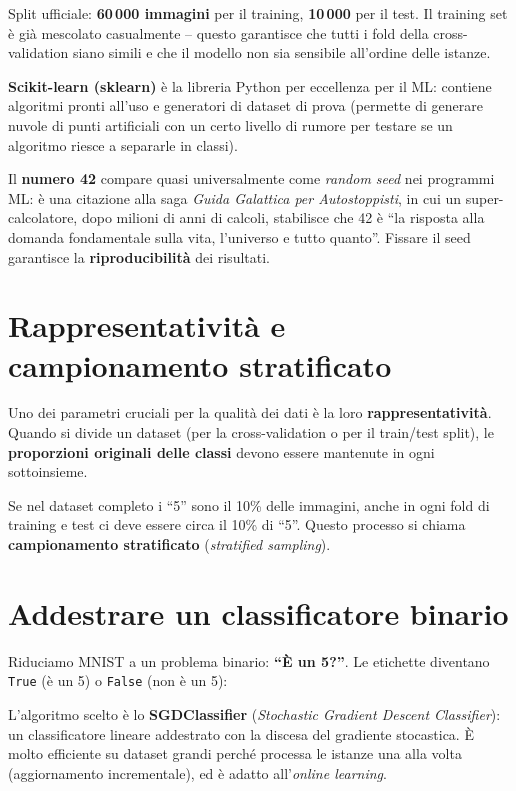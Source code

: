 Split ufficiale: \textbf{60\,000 immagini} per il training, \textbf{10\,000} per il test. Il training set è già mescolato casualmente -- questo garantisce che tutti i fold della cross-validation siano simili e che il modello non sia sensibile all'ordine delle istanze.

\begin{notebox}
\textbf{Scikit-learn (sklearn)} è la libreria Python per eccellenza per il ML: contiene algoritmi pronti all'uso e generatori di dataset di prova (permette di generare nuvole di punti artificiali con un certo livello di rumore per testare se un algoritmo riesce a separarle in classi).

Il \textbf{numero 42} compare quasi universalmente come \emph{random seed} nei programmi ML: è una citazione alla saga \emph{Guida Galattica per Autostoppisti}, in cui un super-calcolatore, dopo milioni di anni di calcoli, stabilisce che 42 è ``la risposta alla domanda fondamentale sulla vita, l'universo e tutto quanto''. Fissare il seed garantisce la \textbf{riproducibilità} dei risultati.
\end{notebox}

\section{Rappresentatività e campionamento stratificato}

Uno dei parametri cruciali per la qualità dei dati è la loro \textbf{rappresentatività}. Quando si divide un dataset (per la cross-validation o per il train/test split), le \textbf{proporzioni originali delle classi} devono essere mantenute in ogni sottoinsieme.

Se nel dataset completo i ``5'' sono il 10\% delle immagini, anche in ogni fold di training e test ci deve essere circa il 10\% di ``5''. Questo processo si chiama \textbf{campionamento stratificato} (\emph{stratified sampling}).

\section{Addestrare un classificatore binario}
Riduciamo MNIST a un problema binario: \textbf{``È un 5?''}. Le etichette diventano \texttt{True} (è un 5) o \texttt{False} (non è un 5):

L'algoritmo scelto è lo \textbf{SGDClassifier} (\emph{Stochastic Gradient Descent Classifier}): un classificatore lineare addestrato con la discesa del gradiente stocastica. È molto efficiente su dataset grandi perché processa le istanze una alla volta (aggiornamento incrementale), ed è adatto all'\emph{online learning}.


